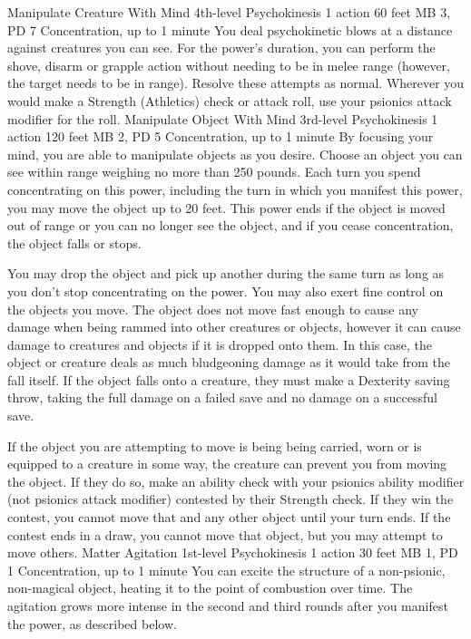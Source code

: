 \DndPowerHeader%
    {Manipulate Creature With Mind\label{pwr:manipulate_creature_with_mind}}
    {4th-level Psychokinesis}
    {1 action}
    {60 feet}
    {MB 3, PD 7}
    {Concentration, up to 1 minute}
You deal psychokinetic blows at a distance
against creatures you can see. For the power's duration,
you can perform the shove, disarm or grapple action without
needing to be in melee range (however, the target needs to
be in range). Resolve these attempts as normal. Wherever you
would make a Strength (Athletics) check or attack roll, use
your psionics attack modifier for the roll.
\DndPowerHeader%
    {Manipulate Object With Mind\label{pwr:manipulate_object_with_mind}}
    {3rd-level Psychokinesis}
    {1 action}
    {120 feet}
    {MB 2, PD 5}
    {Concentration, up to 1 minute}
By focusing your mind, you are able to manipulate
objects as you desire. Choose an object you can see within
range weighing no more than 250 pounds. Each turn you spend
concentrating on this power, including the turn in which you
manifest this power, you may move the object up to 20 feet.
This power ends if the object is moved out of range or you
can no longer see the object, and if you cease concentration,
the object falls or stops.

You may drop the object and pick up another during the same
turn as long as you don't stop concentrating on the power.
You may also exert fine control on the objects you move. The
object does not move fast enough to cause any damage when
being rammed into other creatures or objects, however it can
cause damage to creatures and objects if it is dropped onto
them. In this case, the object or creature deals as much bludgeoning
damage as it would take from the fall itself. If the object
falls onto a creature, they must make a Dexterity saving throw,
taking the full damage on a failed save and no damage on a
successful save.

If the object you are attempting to move is being being carried,
worn or is equipped to a creature in some way, the creature
can prevent you from moving the object. If they do so, make
an ability check with your psionics ability modifier (not
psionics attack modifier) contested by their Strength check.
If they win the contest, you cannot move that and any other
object until your turn ends. If the contest ends in a draw,
you cannot move that object, but you may attempt to move others.
\DndPowerHeader%
    {Matter Agitation\label{pwr:matter_agitation}}
    {1st-level Psychokinesis}
    {1 action}
    {30 feet}
    {MB 1, PD 1}
    {Concentration, up to 1 minute}
You can excite the structure of a non-psionic,
non-magical object,
heating it to the point of combustion over time.
The agitation grows more intense in the second and third rounds
after you manifest the power, as described below.

